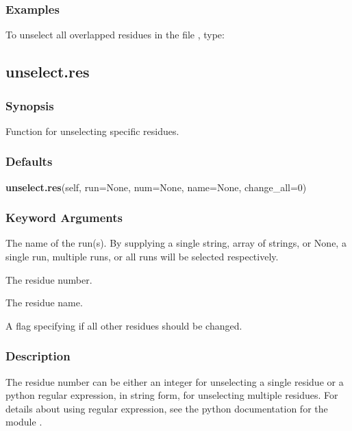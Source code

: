 \subsubsection{Examples}

To unselect all overlapped residues in the file , type:






\newpage

\subsection{unselect.res}


\subsubsection{Synopsis}

Function for unselecting specific residues.



\subsubsection{Defaults}

\textsf{\textbf{unselect.res}(self, run=None, num=None, name=None, change\_all=0)}


\subsubsection{Keyword Arguments}

  The name of the run(s).  By supplying a single string, array of strings, or None, a single run, multiple runs, or all runs will be selected respectively. 

  The residue number. 

  The residue name. 

  A flag specifying if all other residues should be changed. 




\subsubsection{Description}

The residue number can be either an integer for unselecting a single residue or a python regular expression, in string form, for unselecting multiple residues.  For details about using regular expression, see the python documentation for the module .



